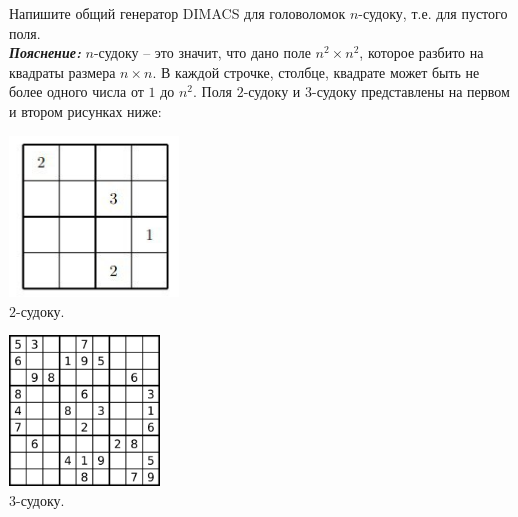 \documentclass[12pt]{extreport}
\theoremstyle{definiton}
\theoremstyle{definition}
\theoremstyle{definition}
\begin{document}
\Pr[10 баллов] Напишите общий генератор DIMACS для головоломок $n$-судоку, т.е. для пустого поля.\\
\textbf{\textit{Пояснение:}} $n$-судоку -- это значит, что дано поле $n^2 \times n^2$, которое разбито на квадраты размера $n \times n$. В каждой строчке, столбце, квадрате  может быть не более одного числа от $1$ до $n^2$. Поля $2$-судоку и $3$-судоку представлены на первом и втором рисунках ниже:
\begin{minipage}{.49\textwidth}
  \centering
  \includegraphics[width=4.5cm]{images/sudoku3.jpg}{\\$2$-судоку.}
\end{minipage}
\begin{minipage}{.49\textwidth}
  \centering
  \includegraphics[width=4.0cm]{images/sudocu2.jpg}{\\$3$-судоку.}
\end{minipage}
\end{document}

